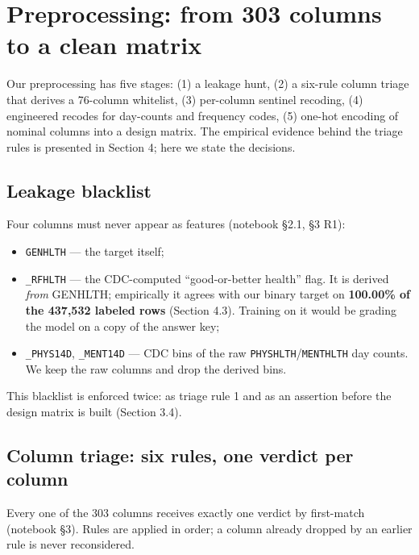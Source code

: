 \documentclass[11pt,a4paper]{article}
\providecommand{\tightlist}{\setlength{\itemsep}{2pt}\setlength{\parskip}{0pt}}
\begin{document}
{\section{Preprocessing: from 303 columns to a clean matrix}\label{preprocessing-from-303-columns-to-a-clean-matrix}

Our preprocessing has five stages: (1) a leakage hunt, (2) a six-rule column triage that derives a 76-column whitelist, (3) per-column sentinel recoding, (4) engineered recodes for day-counts and frequency codes, (5) one-hot encoding of nominal columns into a design matrix. The empirical evidence behind the triage rules is presented in Section 4; here we state the decisions.

\subsection{Leakage blacklist}\label{leakage-blacklist}

Four columns must never appear as features (notebook \S{}2.1, \S{}3 R1):

\begin{itemize}
\tightlist
\item
  \texttt{GENHLTH} --- the target itself;
\item
  \texttt{\_RFHLTH} --- the CDC-computed ``good-or-better health'' flag. It is derived \emph{from} GENHLTH; empirically it agrees with our binary target on \textbf{100.00\% of the 437,532 labeled rows} (Section 4.3). Training on it would be grading the model on a copy of the answer key;
\item
  \texttt{\_PHYS14D}, \texttt{\_MENT14D} --- CDC bins of the raw \texttt{PHYSHLTH}/\texttt{MENTHLTH} day counts. We keep the raw columns and drop the derived bins.
\end{itemize}

This blacklist is enforced twice: as triage rule 1 and as an assertion before the design matrix is built (Section 3.4).

\subsection{Column triage: six rules, one verdict per column}\label{column-triage-six-rules-one-verdict-per-column}

Every one of the 303 columns receives exactly one verdict by first-match (notebook \S{}3). Rules are applied in order; a column already dropped by an earlier rule is never reconsidered.

}
\end{document}
